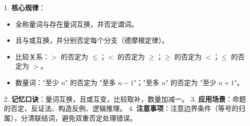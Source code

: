 \begin{summarybox}
1. \textbf{核心规律}：
   \begin{itemize}
       \item 全称量词与存在量词互换，并否定谓词。
       \item 且与或互换，并分别否定每个分支（德摩根定律）。
       \item 比较关系：$>$ 的否定为 $\le$；$<$ 的否定为 $\ge$；$\ge$ 的否定为 $<$；$\le$ 的否定为 $>$。
       \item 数量词："至少 $n$" 的否定为 "至多 $n-1$"；"至多 $n$" 的否定为 "至少 $n+1$"。
   \end{itemize}
2. \textbf{记忆口诀}：量词互换，且或互变，比较取补，数量加减一。
3. \textbf{应用场景}：命题的否定、反证法、构造反例、逻辑推理。
4. \textbf{注意事项}：注意边界条件（等号的归属），分清联结词，避免双重否定处理错误。
\end{summarybox}